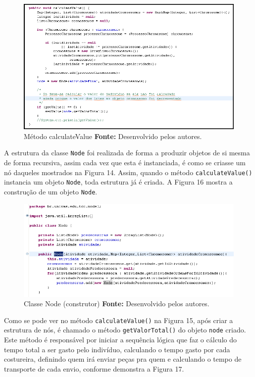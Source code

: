 \newpage

\begin{figure}[h!]
	\centerline{\includegraphics[scale=0.7]{./imagens/codigo_calculate_value.png}}
	\caption[Distribuição de trabalho]
	{Método calculateValue \textbf{Fonte:} Desenvolvido pelos autores.}
	\label{fig:exemplo1}
\end{figure}

\par A estrutura da classe \texttt{Node} foi realizada de forma a produzir objetos de si mesma de forma recursiva, assim 
cada vez que esta é instanciada, é como se criasse um nó daqueles
mostrados na Figura 14.
Assim, quando o método \texttt{calculateValue()} instancia um objeto \texttt{Node}, toda estrutura já é criada. 
A Figura 16 mostra a construção de um objeto \texttt{Node}. 

\begin{figure}[h!]
	\centerline{\includegraphics[scale=0.8]{./imagens/node_class.png}}
	\caption[Distribuição de trabalho]
	{Classe Node (construtor) \textbf{Fonte:} Desenvolvido pelos autores.}
	\label{fig:exemplo1}
\end{figure}


\par Como se pode ver no método \texttt{calculateValue()} na Figura 15, após
criar a estrutura de nós, é chamado o método \texttt{getValorTotal()} do objeto
\texttt{node} criado. Este método é responsável por iniciar a sequência lógica que faz o cálculo do tempo total a ser gasto pelo indivíduo, calculando o tempo gasto por cada costureira, definindo quem irá enviar
peças pra quem e calculando o tempo de transporte de cada envio, conforme demonstra a Figura 17.

